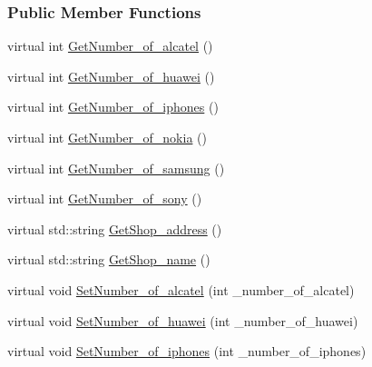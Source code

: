 \subsubsection*{Public Member Functions}
\begin{DoxyCompactItemize}
\item 
virtual int \hyperlink{class_w_a_r_e_h_o_u_s_e_a9d9d5bc37ddd3763ea633d07785b6020_a9d9d5bc37ddd3763ea633d07785b6020}{Get\+Number\+\_\+of\+\_\+alcatel} ()
\item 
virtual int \hyperlink{class_w_a_r_e_h_o_u_s_e_acacc58d1ceea41e968a6d245007ea127_acacc58d1ceea41e968a6d245007ea127}{Get\+Number\+\_\+of\+\_\+huawei} ()
\item 
virtual int \hyperlink{class_w_a_r_e_h_o_u_s_e_a08312d1a68ff48d459ad637df6aaf2f1_a08312d1a68ff48d459ad637df6aaf2f1}{Get\+Number\+\_\+of\+\_\+iphones} ()
\item 
virtual int \hyperlink{class_w_a_r_e_h_o_u_s_e_a1a0f7539989c00290934e8b671f2fb1c_a1a0f7539989c00290934e8b671f2fb1c}{Get\+Number\+\_\+of\+\_\+nokia} ()
\item 
virtual int \hyperlink{class_w_a_r_e_h_o_u_s_e_a817b030450f48bc24e3cc6de5dadefec_a817b030450f48bc24e3cc6de5dadefec}{Get\+Number\+\_\+of\+\_\+samsung} ()
\item 
virtual int \hyperlink{class_w_a_r_e_h_o_u_s_e_abb7da1fee113e81fbb06190606fddb4d_abb7da1fee113e81fbb06190606fddb4d}{Get\+Number\+\_\+of\+\_\+sony} ()
\item 
virtual std\+::string \hyperlink{class_w_a_r_e_h_o_u_s_e_a50c29c2f95d148239e8b43b8a0046a31_a50c29c2f95d148239e8b43b8a0046a31}{Get\+Shop\+\_\+address} ()
\item 
virtual std\+::string \hyperlink{class_w_a_r_e_h_o_u_s_e_a4d39386ec25ec71b513eb7382e5cd869_a4d39386ec25ec71b513eb7382e5cd869}{Get\+Shop\+\_\+name} ()
\item 
virtual void \hyperlink{class_w_a_r_e_h_o_u_s_e_a91b45d7d40a154308644a9f2b1767d28_a91b45d7d40a154308644a9f2b1767d28}{Set\+Number\+\_\+of\+\_\+alcatel} (int \+\_\+number\+\_\+of\+\_\+alcatel)
\item 
virtual void \hyperlink{class_w_a_r_e_h_o_u_s_e_ad29bd0333bd7f17178dc107a00e23954_ad29bd0333bd7f17178dc107a00e23954}{Set\+Number\+\_\+of\+\_\+huawei} (int \+\_\+number\+\_\+of\+\_\+huawei)
\item 
virtual void \hyperlink{class_w_a_r_e_h_o_u_s_e_a05e7450e1f1e711a53a4d9d40fb9dfa3_a05e7450e1f1e711a53a4d9d40fb9dfa3}{Set\+Number\+\_\+of\+\_\+iphones} (int \+\_\+number\+\_\+of\+\_\+iphones)
\item 

\end{DoxyCompactItemize}

